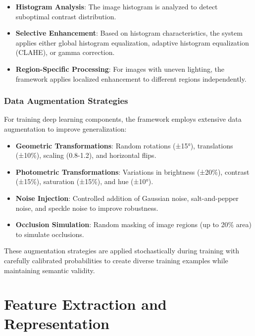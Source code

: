\begin{itemize}
    \item \textbf{Histogram Analysis}: The image histogram is analyzed to detect suboptimal contrast distribution.
    
    \item \textbf{Selective Enhancement}: Based on histogram characteristics, the system applies either global histogram equalization, adaptive histogram equalization (CLAHE), or gamma correction.
    
    \item \textbf{Region-Specific Processing}: For images with uneven lighting, the framework applies localized enhancement to different regions independently.
\end{itemize}

\subsubsection{Data Augmentation Strategies}
For training deep learning components, the framework employs extensive data augmentation to improve generalization:

\begin{itemize}
    \item \textbf{Geometric Transformations}: Random rotations (±15°), translations (±10\%), scaling (0.8-1.2), and horizontal flips.
    
    \item \textbf{Photometric Transformations}: Variations in brightness (±20\%), contrast (±15\%), saturation (±15\%), and hue (±10°).
    
    \item \textbf{Noise Injection}: Controlled addition of Gaussian noise, salt-and-pepper noise, and speckle noise to improve robustness.
    
    \item \textbf{Occlusion Simulation}: Random masking of image regions (up to 20\% area) to simulate occlusions.
\end{itemize}

These augmentation strategies are applied stochastically during training with carefully calibrated probabilities to create diverse training examples while maintaining semantic validity.

\section{Feature Extraction and Representation}

